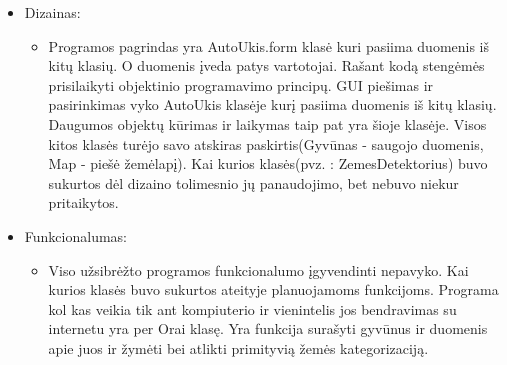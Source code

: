 \documentclass[oneside]{VUMIFPSkursinis}
\begin{document}
	\begin{itemize}
		\item Dizainas: 
		\begin{itemize}
			\item Programos pagrindas yra AutoUkis.form klasė kuri pasiima duomenis iš kitų klasių. O duomenis įveda patys vartotojai. Rašant kodą stengėmės prisilaikyti objektinio programavimo principų. GUI piešimas ir pasirinkimas vyko AutoUkis klasėje kurį pasiima duomenis iš kitų klasių. Daugumos objektų kūrimas ir laikymas taip pat yra šioje klasėje. Visos kitos klasės turėjo savo atskiras paskirtis(Gyvūnas - saugojo duomenis, Map - piešė žemėlapį). Kai kurios klasės(pvz. : ZemesDetektorius) buvo sukurtos dėl dizaino tolimesnio jų panaudojimo, bet nebuvo niekur pritaikytos.
		\end{itemize}
		\item Funkcionalumas:
		\begin{itemize}
		\item Viso užsibrėžto programos funkcionalumo įgyvendinti nepavyko. Kai kurios klasės buvo sukurtos ateityje planuojamoms funkcijoms. Programa kol kas veikia tik ant kompiuterio ir vienintelis jos bendravimas su internetu yra per Orai klasę. Yra funkcija surašyti gyvūnus ir duomenis apie juos ir žymėti bei atlikti primityvią žemės kategorizaciją.
		\end{itemize}	
	\end{itemize}
\end{document}
